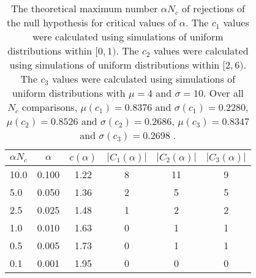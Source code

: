 \begin{table}[h!]
\begin{center}
\begin{tabular}{| l | c | c | c | c | c |}\hline
$\alpha N_c$ & $\alpha$ & $c(\alpha)$ & $|C_1(\alpha)|$ & $|C_2(\alpha)|$ & $|C_3(\alpha)|$ \\\hline\hline
10.0 & 0.100 & 1.22 & 8 & 11 & 9 \\\hline
5.0 & 0.050 & 1.36 & 2 & 5 & 5 \\\hline
2.5 & 0.025 & 1.48 & 1 & 2 & 2 \\\hline
1.0 & 0.010 & 1.63 & 0 & 1 & 1 \\\hline
0.5 & 0.005 & 1.73 & 0 & 1 & 1 \\\hline
0.1 & 0.001 & 1.95 & 0 & 0 & 0 \\\hline
\end{tabular}
\caption{The theoretical maximum number $\alpha N_c$ of rejections
of the null hypothesis for critical values of $\alpha$.
The $c_1$ values were calculated using simulations of uniform distributions within $[0,1)$.
The $c_2$ values were calculated using simulations of uniform distributions within $[2,6)$.
The $c_3$ values were calculated using simulations of uniform distributions with $\mu=4$ and $\sigma=10$.
Over all $N_c$ comparisons,
 $\mu(c_1)=0.8376$ and $\sigma(c_1)=0.2280$,
 $\mu(c_2)=0.8526$ and $\sigma(c_2)=0.2686$,
 $\mu(c_3)=0.8347$ and $\sigma(c_3)=0.2698$ .
}
\end{center}
\end{table}